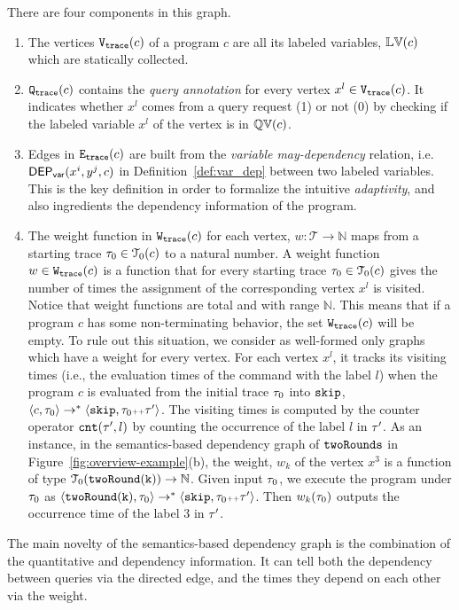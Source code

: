 {There are four components in this graph.
\begin{enumerate}
    \item The vertices $\mathtt{{V_{trace}}}({c})$ of a program $c$ are all its labeled variables, $\mathbb{LV}(c)$ which are statically collected.
    \item $\mathtt{{Q_{trace}}}(c)$ contains the \emph{query annotation} for 
    every vertex $x^l \in \mathtt{{V_{trace}}}(c)$. It indicates whether $x^l$ comes from a query request (1) or not (0) by checking if the labeled variable $x^l$ of the vertex is in $\mathbb{QV}(c)$.
    \item Edges in $\mathtt{{E_{trace}}}(c)$ are built from the  \emph{variable may-dependency} relation, i.e. $\mathsf{DEP_{var}}(x^i, y^j, c)$ in Definition~\ref{def:var_dep} between two labeled variables.
    This is the key definition in order to formalize the intuitive \emph{adaptivity}, and also ingredients the dependency information of the program.
    \item 
  The weight function in $\mathtt{{W_{trace}}}(c)$ for each vertex, $w : \mathcal{T} \to \mathbb{N}$
maps from a starting trace $\mathtt{\tau}_0 \in \mathcal{T}_0(c)$ to a natural number.
A weight function $w \in \mathtt{{W_{trace}}}(c)$ is a function that for every starting trace $\mathtt{\tau}_0 \in \mathcal{T}_0(c)$ 
gives the number of times the assignment of the corresponding vertex $x^l$ is visited. Notice that weight functions are total and with range $\mathbb{N}$. This means that if a program $c$ has some non-terminating behavior, the set $\mathtt{{W_{trace}}}(c)$ will be empty.
To rule out this situation, we consider as well-formed only graphs which have a weight for every vertex. 
For each vertex $x^l$, it tracks its visiting times (i.e., the evaluation times of the command with the label $l$) when the program $c$ is evaluated from the initial trace $\mathtt{\tau}_0$ into $\mathtt{skip}$, $\langle {c}, \mathtt{\tau}_0 \rangle \to^{*} \langle \mathtt{skip}, \mathtt{\tau}_0{\scriptscriptstyle ++}\mathtt{\tau}' \rangle $.
The visiting times is computed by the counter operator $\mathtt{cnt}(\mathtt{\tau}', l)$
by counting the occurrence of the label $l$ in $\mathtt{\tau}'$.
As an instance, in the semantics-based dependency graph of $\mathtt{twoRounds}$ in Figure~\ref{fig:overview-example}(b), the weight, $w_k$ of the vertex $x^3$ is a function of type $\mathcal{T}_0(\mathtt{twoRound(k)}) \to \mathbb{N}$.
Given input $\mathtt{\tau}_0$, we execute the program under $\mathtt{\tau}_0$ as $\langle \mathtt{twoRound(k)}, \mathtt{\tau}_0 \rangle \to^{*} \langle \mathtt{skip}, \mathtt{\tau}_0{\scriptscriptstyle ++}\mathtt{\tau}' \rangle $. Then $w_k(\mathtt{\tau}_0)$ outputs the occurrence time of the label $3$ in $\mathtt{\tau}'$.
\end{enumerate}
The main novelty of  the semantics-based dependency graph is the combination of the quantitative and dependency information. 
It can tell both the dependency between queries via the directed edge, and the times they depend on each other via the weight.
}

